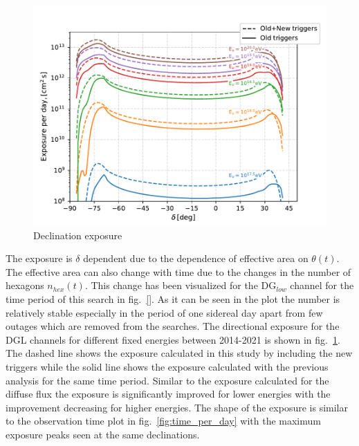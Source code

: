 \begin{figure}[t!]
  \centering
  \includegraphics[width=14.5cm]{thesis_figures/PointLimits/Exposure_vs_Dec.pdf}
  \caption{Declination exposure}
  \label{fig:Exp_dec}
\end{figure}


The exposure is $\delta$ dependent due to the dependence of effective area on $\theta(t)$. The effective area can also change with time due to the changes in the number of hexagons $n_{hex}(t)$. This change has been visualized for the DG$_{low}$ channel for the time period of this search in fig.~\ref{}. As it can be seen in the plot the number is relatively stable especially in the period of one sidereal day apart from few outages which are removed from the searches. The directional exposure for the DGL channels for different fixed energies between 2014-2021 is shown in fig.~\ref{fig:Exp_dec}. The dashed line shows the exposure calculated in this study by including the new triggers while the solid line shows the exposure calculated with the previous analysis for the same time period. Similar to the exposure calculated for the diffuse flux the exposure is significantly improved for lower energies with the improvement decreasing for higher energies. The shape of the exposure is similar to the observation time plot in fig.~\ref{fig:time_per_day} with the maximum exposure peaks seen at the same declinations. 


